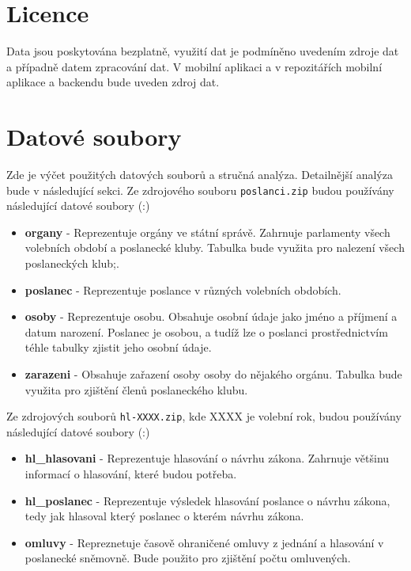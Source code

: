 \section{Licence}

Data jsou poskytována bezplatně, využití dat je podmíněno uvedením zdroje dat a případně datem zpracování dat. V mobilní aplikaci a v repozitářích mobilní aplikace a backendu bude uveden zdroj dat. 

\section{Datové soubory}

Zde je výčet použitých datových souborů a stručná analýza. Detailnější analýza bude v následující sekci. Ze zdrojového souboru \lstinline|poslanci.zip| budou používány následující datové soubory (\cite{zip-members}:)

\begin{itemize}
	\item \textbf{organy} - Reprezentuje orgány ve státní správě. Zahrnuje parlamenty všech volebních období a poslanecké kluby. Tabulka bude využita pro nalezení všech poslaneckých klub;.
	\item \textbf{poslanec} - Reprezentuje poslance v různých volebních obdobích.
	\item \textbf{osoby} - Reprezentuje osobu. Obsahuje osobní údaje jako jméno a příjmení a datum narození. Poslanec je osobou, a tudíž lze o poslanci prostřednictvím téhle tabulky zjistit jeho osobní údaje.
	\item \textbf{zarazeni} - Obsahuje zařazení osoby osoby do nějakého orgánu. Tabulka bude využita pro zjištění členů poslaneckého klubu.
\end{itemize}

\noindent Ze zdrojových souborů \lstinline|hl-XXXX.zip|, kde XXXX je volební rok, budou používány následující datové soubory (\cite{zip-votes}:)

\begin{itemize}
	\item \textbf{hl\_hlasovani} - Reprezentuje hlasování o návrhu zákona. Zahrnuje většinu informací o hlasování, které budou potřeba.
	\item \textbf{hl\_poslanec} - Reprezentuje výsledek hlasování poslance o návrhu zákona, tedy jak hlasoval který poslanec o kterém návrhu zákona.
	\item \textbf{omluvy} - Repreznetuje časově ohraničené omluvy z jednání a hlasování v poslanecké sněmovně. Bude použito pro zjištění počtu omluvených. 
\end{itemize}

